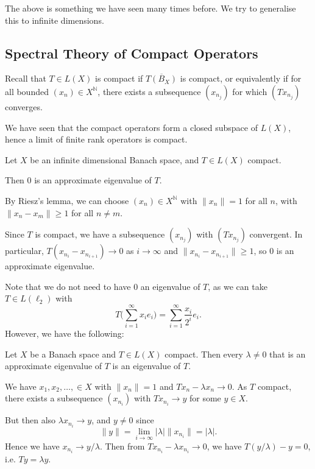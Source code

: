 \documentclass[12pt]{article}
\begin{document}
The above is something we have seen many times before. We try to generalise this to infinite dimensions.

\subsection{Spectral Theory of Compact Operators}
\label{sub:spec_comp}

Recall that $T \in L(X)$ is compact if $\overline{T(B_X)}$ is compact, or equivalently if for all bounded $(x_n) \in X^{\mathbb{N}}$, there exists a subsequence $(x_{n_j})$ for which $(T x_{n_j})$ converges.

We have seen that the compact operators form a closed subspace of $L(X)$, hence a limit of finite rank operators is compact.

\begin{proposition}
	Let $X$ be an infinite dimensional Banach space, and $T \in L(X)$ compact.

	Then 0 is an approximate eigenvalue of $T$.
\end{proposition}

\begin{proofbox}
	By Riesz's lemma, we can choose $(x_n) \in X^{\mathbb{N}}$ with $\|x_n\| = 1$ for all $n$, with $\|x_n - x_m\| \geq 1$ for all $n \neq m$.

	Since $T$ is compact, we have a subsequence $(x_{n_j})$ with $(Tx_{n_j})$ convergent. In particular, $T(x_{n_i} - x_{n_{i+1}}) \to 0$ as $i \to \infty$ and $\|x_{n_i} - x_{n_{i+1}}\| \geq 1$, so $0$ is an approximate eigenvalue.
\end{proofbox}

Note that we do not need to have $0$ an eigenvalue of $T$, as we can take $T \in L(\ell_2)$ with
\[
T \biggl( \sum_{i = 1}^{\infty} x_i e_i \biggr) = \sum_{i = 1}^{\infty} \frac{x_i}{2^i} e_i.
\]
However, we have the following:

\begin{proposition}
	Let $X$ be a Banach space and $T \in L(X)$ compact. Then every $\lambda \neq 0$ that is an approximate eigenvalue of $T$ is an eigenvalue of $T$.
\end{proposition}

\begin{proofbox}
	We have $x_1, x_2, \ldots, \in X$ with $\|x_n\| = 1$ and $Tx_n - \lambda x_n \to 0$. As $T$ compact, there exists a subsequence $(x_{n_i})$ with $Tx_{n_i} \to y$ for some $y \in X$.

	But then also $\lambda x_{n_i} \to y$, and $y \neq 0$ since
	\[
	\|y\| = \lim_{i \to \infty} |\lambda| \|x_{n_i}\| = |\lambda|.
	\]
	Hence we have $x_{n_i} \to y/\lambda$. Then from $Tx_{n_i} - \lambda x_{n_i} \to 0$, we have $T(y/\lambda) - y = 0$, i.e. $Ty = \lambda y$.
\end{proofbox}
\end{document}

